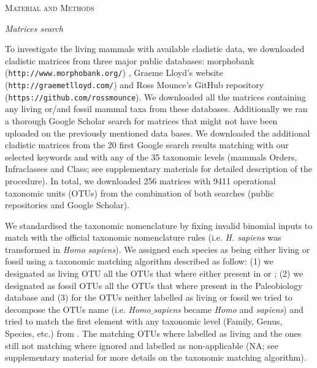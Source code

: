 \documentclass[12pt,letterpaper]{article}
\renewcommand{\section}[1]{%
\bigskip
\begin{center}
\begin{Large}
\normalfont\scshape #1
\medskip
\end{Large}
\end{center}}
\renewcommand{\subsection}[1]{%
\bigskip
\begin{center}
\begin{large}
\normalfont\itshape #1
\end{large}
\end{center}}
\begin{document}
%
%
 

\section{Material and Methods}
\subsection{Matrices search}
To investigate the living mammals with available cladistic data, we downloaded cladistic matrices from three major public databases: morphobank (\texttt{http://www.morphobank.org/}) \citep{morphobank}, Graeme Lloyd's website (\texttt{http://graemetlloyd.com/}) and Ross Mounce's GitHub repository (\texttt{https://github.com/rossmounce}).
We downloaded all the matrices containing any living or/and fossil mammal taxa from these databases.
Additionally we ran a thorough Google Scholar search for matrices that might not have been uploaded on the previously mentioned data bases.
We downloaded the additional cladistic matrices from the 20 first Google search results matching with our selected keywords and with any of the 35 taxonomic levels (mammals Orders, Infraclasses and Class; see supplementary materials for detailed description of the procedure).
In total, we downloaded 256 %
matrices with 9411 %
operational taxonomic units (OTUs) from the combination of both searches (public repositories and Google Scholar). %

We standardised the taxonomic nomenclature by fixing invalid binomial inputs to match with the official taxonomic nomenclature rules (i.e. \textit{H. sapiens} was transformed in \textit{Homo sapiens}).
We assigned each species as being either living or fossil using a taxonomic matching algorithm described as follow: (1) we designated as living OTU all the OTUs that where either present in \citep{FritzTree} or \citep{wilson2005mammal}; (2) we designated as fossil OTUs all the OTUs that where present in the Paleobiology database and (3) for the OTUs neither labelled as living or fossil we tried to decompose the OTUs name (i.e. \textit{Homo$\_$sapiens} became \textit{Homo} and \textit{sapiens}) and tried to match the first element with any taxonomic level (Family, Genus, Species, etc.) from \citep{wilson2005mammal}. %
The matching OTUs where labelled as living and the ones still not matching where ignored and labelled as non-applicable (NA; see supplementary material for more details on the taxonomic matching algorithm).
\end{document}
